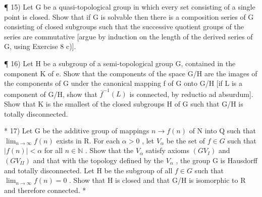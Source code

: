¶ 15) Let G be a quasi-topological group in which every set consisting of a single point is closed. Show that if G is solvable then there is a composition series of G consisting of closed subgroups such that the successive quotient groups of the series are commutative {[}argue by induction on the length of the derived series of G, using Exercise 8 c){]}.

¶ 16) Let H be a subgroup of a semi-topological group G, contained in the component K of e. Show that the components of the space G/H are the images of the components of G under the canonical mapping f of G onto G/H {[}if L is a component of G/H, show that \(\overline{f}^{-1}(L)\) is connected, by reductio ad absurdum{]}. Show that K is the smallest of the closed subgroups H of G such that G/H is totally disconnected.

* 17) Let G be the additive group of mappings \(n \to f(n)\) of N into Q such that \(\lim_{n \to \infty} f(n)\) exists in R. For each \(\alpha > 0\) , let \(V_{\alpha}\) be the set of \(f \in G\) such that \(|f(n)| < \alpha\) for all \(n \in \mathbb{N}\) . Show that the \(V_{\alpha}\) satisfy axioms \((GV_{I})\) and \((GV_{II})\) and that with the topology defined by the \(V_{\alpha}\) , the group G is Hausdorff and totally disconnected. Let H be the subgroup of all \(f \in G\) such that \(\lim_{n \to \infty} f(n) = 0\) . Show that H is closed and that G/H is isomorphic to R and therefore connected. *

